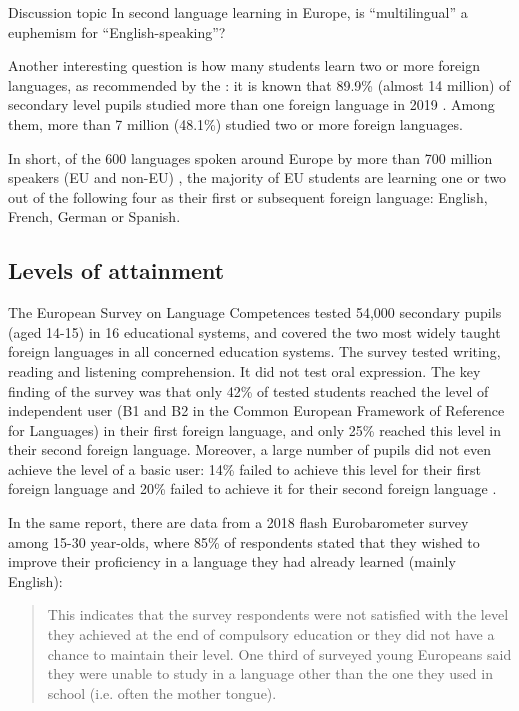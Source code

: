 \documentclass[output=paper]{langscibook}
\begin{document}
\begin{tblsframed}{Discussion topic}
In second language learning in Europe, is “multilingual” a euphemism for “English-speaking”?
\end{tblsframed}

Another interesting question is how many students learn two or more foreign languages, as recommended by the \citet{EuropeanCouncil2002}: it is known that 89.9\% (almost 14 million) of secondary level pupils studied more than one foreign language in 2019 \citep{Eurostat2022}. Among them, more than 7 million (48.1\%) studied two or more foreign languages. 

In short, of the 600 languages spoken around Europe by more than 700 million speakers (EU and non-EU) \citep{WorldBank2020}, the majority of EU students are learning one or two out of the following four as their first or subsequent foreign language: English, French, German or Spanish. 

\subsection{Levels of attainment}

The European Survey on Language Competences \citep{EuropeanCommission2019} tested 54,000 secondary pupils (aged 14-15) in 16 educational systems, and covered the two most widely taught foreign languages in all concerned education systems. The survey tested writing, reading and listening comprehension. It did not test oral expression. The key finding of the survey was that only 42\% of tested students reached the level of independent user (B1 and B2 in the Common European Framework of Reference for Languages) in their first foreign language, and only 25\% reached this level in their second foreign language. Moreover, a large number of pupils did not even achieve the level of a basic user: 14\% failed to achieve this level for their first foreign language and 20\% failed to achieve it for their second foreign language \citep{EuropeanCommission2019}.

In the same report, there are data from a 2018 flash Eurobarometer survey among 15-30 year-olds, where 85\% of respondents stated that they wished to improve their proficiency in a language they had already learned (mainly English): 

\begin{quote}
This indicates that the survey respondents were not satisfied with the level they achieved at the end of compulsory education or they did not have a chance to maintain their level. One third of surveyed young Europeans said they were unable to study in a language other than the one they used in school (i.e. often the mother tongue). \citep[102]{EuropeanCommission2019}  
\end{quote}
\end{document}
